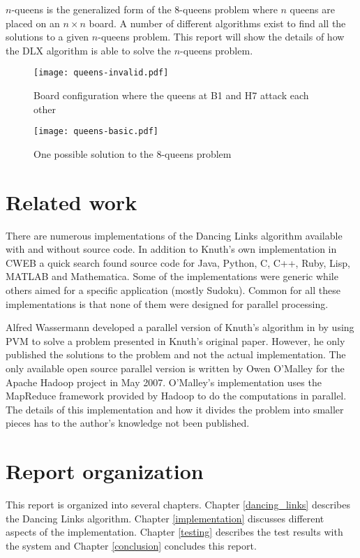 $n$-queens is the generalized form of the 8-queens problem where $n$ queens are placed on an $n \times n$ board.
A number of different algorithms exist to find all the solutions to a given $n$-queens problem.
This report will show the details of how the DLX algorithm is able to solve the $n$-queens problem.

\begin{figure}[hptb]
	\centering 
	\texttt{[image: queens-invalid.pdf]}
	\caption{Board configuration where the queens at B1 and H7 attack each other}
	\label{fig:8queens-invalid}
\end{figure}

\begin{figure}[hptb]
	\centering 
	\texttt{[image: queens-basic.pdf]}
	\caption{One possible solution to the 8-queens problem}
	\label{fig:8queens}
\end{figure}



\section{Related work}

There are numerous implementations of the Dancing Links algorithm available with and without source code.
In addition to Knuth's own implementation in CWEB \cite{cweb} a quick search found source code for Java, Python, C, C++, Ruby, Lisp, MATLAB and Mathematica.
Some of the implementations were generic while others aimed for a specific application (mostly Sudoku).
Common for all these implementations is that none of them were designed for parallel processing.

Alfred Wassermann developed a parallel version of Knuth's algorithm in \cite{wassermann99covering} by using PVM \cite{pvm} to solve a problem presented in Knuth's original paper.
However, he only published the solutions to the problem and not the actual implementation.
The only available open source parallel version is written by Owen O'Malley for the Apache Hadoop project \cite{hadoop} in May 2007.
O'Malley's implementation uses the MapReduce framework \cite{map-reduce} provided by Hadoop to do the computations in parallel.
The details of this implementation and how it divides the problem into smaller pieces has to the author's knowledge not been published.



\section{Report organization}

This report is organized into several chapters.
Chapter \ref{dancing_links} describes the Dancing Links algorithm.
Chapter \ref{implementation} discusses different aspects of the implementation.
Chapter \ref{testing} describes the test results with the system and Chapter \ref{conclusion} concludes this report.
